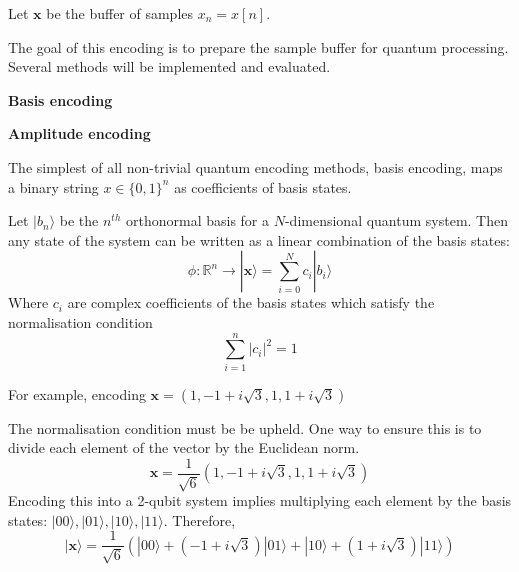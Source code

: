 Let $\mathbf{x}$ be the buffer of samples $x_n=x[n]$.

The goal of this encoding is to prepare the sample buffer for quantum processing.
Several methods will be implemented and evaluated.

\textbf{Basis encoding}

\textbf{Amplitude encoding}

The simplest of all non-trivial quantum encoding methods, basis encoding, maps a binary string $x \in {\{0,1\}}^n$ as coefficients of basis states.

Let $\vert b_n \rangle$ be the $n^{th}$ orthonormal basis for a $N$-dimensional quantum system.
Then any state of the system can be written as a linear combination of the basis states:
\begin{equation}
    \displaystyle{
        \phi: \mathbb{R}^n \rightarrow | \mathbf{x} \rangle =
        \sum_{i=0}^{N}
            c_i | b_i \rangle
    }
\end{equation}
Where $c_i$ are complex coefficients of the basis states which satisfy the normalisation condition
\begin{equation}
    \displaystyle{\sum_{i=1}^n |c_i|^2 = 1}
\end{equation}

For example, encoding $\mathbf{x} = (1, -1+i\sqrt{3}, 1, 1+i\sqrt{3})$

The normalisation condition must be be upheld.
One way to ensure this is to divide each element of the vector by the Euclidean norm.
\begin{equation}
    \displaystyle{\mathbf{x} = \frac{1}{\sqrt{6}}(1, -1+i\sqrt{3}, 1, 1+i\sqrt{3})}
\end{equation}
Encoding this into a 2-qubit system implies multiplying each element by the basis states: $|00\rangle, |01\rangle, |10\rangle, |11\rangle$.
Therefore, 
\begin{equation}
    \displaystyle{
        | \mathbf{x} \rangle =
        \frac{1}{\sqrt{6}}
        (
            |00\rangle +
            (-1 + i\sqrt{3}) |01\rangle +
            |10\rangle +
            (1 + i\sqrt{3}) |11\rangle
        )
    }
\end{equation}


